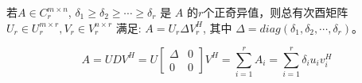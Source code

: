若$ A\in C_r^{m \times n} $, $ \delta_1 \geq \delta_2 \geq \cdots \geq \delta_r $ 是 $ A $ 的$ r $个正奇异值，则总有次酉矩阵$ U_r \in U^{m \times r}_r, V_r \in V^{n \times r}_r$ 满足: $ A = U_r \Delta V_r^H $, 其中 $ \Delta = diag(\delta_1,\delta_2, \cdots, \delta_r) $。


\begin{displaymath}
	A = UDV^H = U\begin{bmatrix} \Delta & 0 \\ 0 & 0 \end{bmatrix} V^H = \sum^r_{i=1} A_i = \sum^r_{i=1}\delta_i u_i v_i^H
\end{displaymath}
